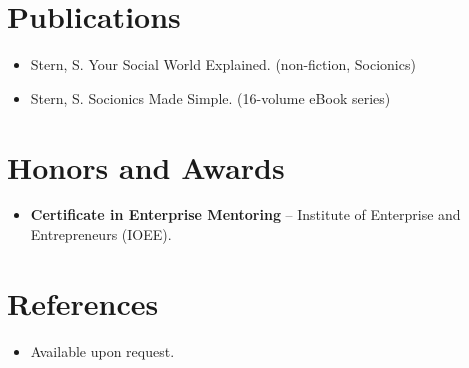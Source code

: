 \documentclass[11pt,a4paper,sans]{moderncv}
\begin{document}

\section{Publications}
\vspace{1pt}
\begin{itemize}
\item Stern, S. Your Social World Explained. (non-fiction, Socionics)
\item Stern, S. Socionics Made Simple. (16-volume eBook series)
\end{itemize}


\section{Honors and Awards}
\vspace{1pt}
\begin{itemize}
\item{\textbf{Certificate in Enterprise Mentoring} -- Institute of Enterprise and Entrepreneurs (IOEE).}
\end{itemize}


\section{References}
\vspace{1pt}
\begin{itemize}
\item{Available upon request.}
\end{itemize}
\end{document}
